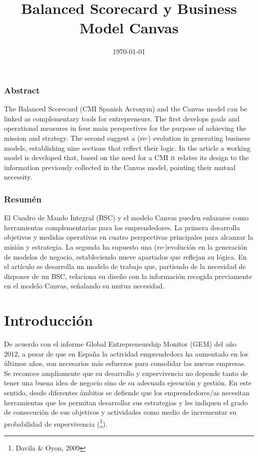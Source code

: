 \documentclass[a4paper,12pt,twocolumn]{article}
\title{Balanced Scorecard y Business Model Canvas}
\date{\today}
\begin{document}
\maketitle
\subsubsection*{Abstract}
The Balanced Scorecard (CMI Spanish Acronym) and the Canvas model can be linked as complementary tools for entrepreneurs. The first develops goals and operational measures in four main perspectives for the purpose of achieving the mission and strategy. The second suggest a (re-) evolution in generating business models, establishing nine sections that reflect their logic. In the article a working model is developed that, based on the need for a CMI it relates its design to the information previously collected in the Canvas model, pointing their mutual necessity.
\subsubsection*{Resumén}
El Cuadro de Mando Integral (BSC) y el modelo Canvas pueden enlazarse como herramientas complementarias para los emprendedores. La primera desarrolla objetivos y medidas operativas en cuatro perspectivas principales para alcanzar la misión y estrategia. La segunda ha supuesto una (re-)evolución en la generación de modelos de negocio, estableciendo nueve apartados que reflejan su lógica. En el artículo se desarrolla un modelo de trabajo que, partiendo de la necesidad de disponer de un BSC, relaciona su diseño con la información recogida previamente en el modelo Canvas, señalando su mutua necesidad.

\section{Introducción}
\item{De acuerdo con el informe Global Entrepreneurship Monitor (GEM) del año 2012, a pesar de que en España la actividad emprendedora ha aumentado en los últimos años, son necesarios más esfuerzos para consolidar las nuevas empresas. Se reconoce ampliamente que su desarrollo y supervivencia no depende tanto de tener una buena idea de negocio sino de su adecuada ejecución y gestión. En este sentido, desde diferentes ámbitos se defiende que los emprendedores/as necesitan herramientas que les permitan desarrollar sus estrategias y les indiquen el grado de consecución de sus objetivos y actividades como medio de incrementar su probabilidad de supervivencia (\footnote{Davila & Oyon, 2009}).}
\end{document}
